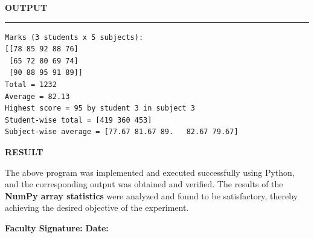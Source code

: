 \documentclass[11pt,twoside]{article}
\newcommand{\expheading}[1]{{\fontsize{14}{17}\selectfont\textbf{#1}\par}}
\newcommand{\tooddpage}{\clearpage\ifodd\value{page}\else\null\thispagestyle{empty}\newpage\fi}
\newcommand{\toevenpage}{\clearpage\ifodd\value{page}\null\thispagestyle{empty}\newpage\fi}
\begin{document}
\toevenpage
\expheading{OUTPUT}
\vspace{2pt}
\noindent\rule{\textwidth}{0.5pt}\par
\vspace{4pt}
\begin{verbatim}
Marks (3 students x 5 subjects):
[[78 85 92 88 76]
 [65 72 80 69 74]
 [90 88 95 91 89]]
Total = 1232
Average = 82.13
Highest score = 95 by student 3 in subject 3
Student-wise total = [419 360 453]
Subject-wise average = [77.67 81.67 89.   82.67 79.67]
\end{verbatim}
\vspace{4pt}

\tooddpage
\expheading{RESULT}
\vspace{4pt}
{\fontsize{12}{15}\selectfont
The above program was implemented and executed successfully using Python, and the corresponding output was obtained and verified. The results of the \textbf{NumPy array statistics} were analyzed and found to be satisfactory, thereby achieving the desired objective of the experiment.\par
}

\vspace{12pt}

\noindent\textbf{Faculty Signature:} \underline{\hspace{3.6cm}} \hfill \textbf{Date:} \underline{\hspace{2.8cm}}\par

\tooddpage
\end{document}

